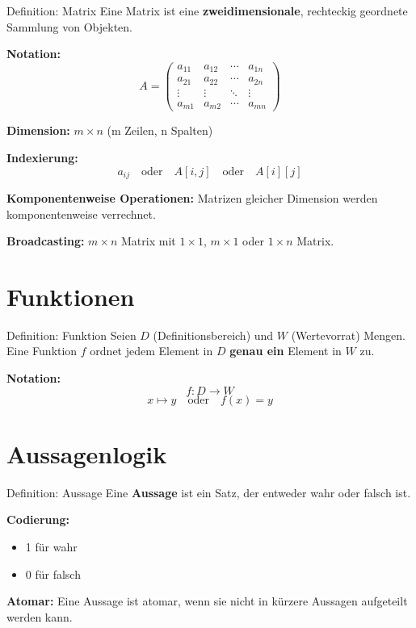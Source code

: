 \documentclass[a4paper, fontsize=7pt]{scrartcl}
\begin{document}
\begin{mainbox}{Definition: Matrix}
Eine Matrix ist eine \textbf{zweidimensionale}, rechteckig geordnete Sammlung von Objekten.

\textbf{Notation:}
$$A = \begin{pmatrix} a_{11} & a_{12} & \cdots & a_{1n} \\ a_{21} & a_{22} & \cdots & a_{2n} \\ \vdots & \vdots & \ddots & \vdots \\ a_{m1} & a_{m2} & \cdots & a_{mn} \end{pmatrix}$$

\textbf{Dimension:} $m \times n$ (m Zeilen, n Spalten)

\textbf{Indexierung:}
$$a_{ij} \quad \text{oder} \quad A[i,j] \quad \text{oder} \quad A[i][j]$$

\textbf{Komponentenweise Operationen:}
Matrizen gleicher Dimension werden komponentenweise verrechnet.

\textbf{Broadcasting:}
$m \times n$ Matrix mit $1 \times 1$, $m \times 1$ oder $1 \times n$ Matrix.
\end{mainbox}

\section{Funktionen}

\begin{mainbox}{Definition: Funktion}
Seien $D$ (Definitionsbereich) und $W$ (Wertevorrat) Mengen. Eine Funktion $f$ ordnet jedem Element in $D$ \textbf{genau ein} Element in $W$ zu.

\textbf{Notation:}
$$f : D \longrightarrow W$$
$$x \mapsto y \quad \text{oder} \quad f(x) = y$$
\end{mainbox}

\section{Aussagenlogik}

\begin{mainbox}{Definition: Aussage}
Eine \textbf{Aussage} ist ein Satz, der entweder wahr oder falsch ist.

\textbf{Codierung:}
\begin{itemize}
    \item 1 für wahr
    \item 0 für falsch
\end{itemize}

\textbf{Atomar:} Eine Aussage ist atomar, wenn sie nicht in kürzere Aussagen aufgeteilt werden kann.
\end{mainbox}
\end{document}
